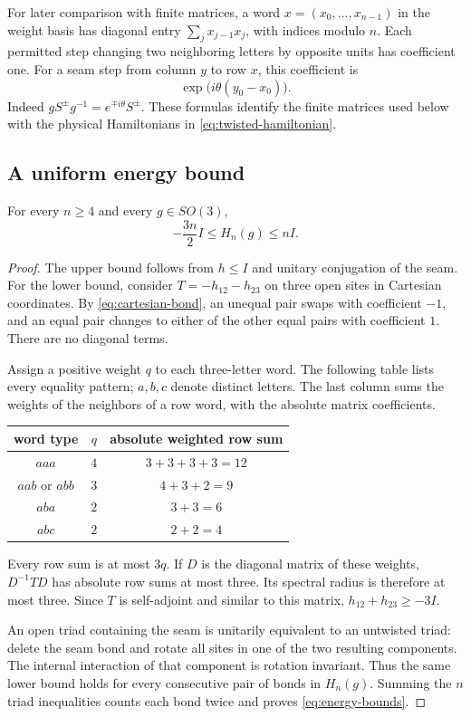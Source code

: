 For later comparison with finite matrices, a word $x=(x_0,\ldots,x_{n-1})$
in the weight basis has diagonal entry $\sum_j x_{j-1}x_j$, with indices
modulo $n$. Each permitted step changing two neighboring letters by
opposite units has coefficient one. For a seam step from column $y$ to
row $x$, this coefficient is
\begin{equation}\label{eq:seam-phase}
 \exp\bigl(i\theta(y_0-x_0)\bigr).
\end{equation}
Indeed $gS^\pm g^{-1}=e^{\mp i\theta}S^\pm$. These formulas identify the
finite matrices used below with the physical Hamiltonians in
\eqref{eq:twisted-hamiltonian}.

\subsection{A uniform energy bound}

\begin{lemma}\label{lem:energy}
For every $n\ge4$ and every $g\in SO(3)$,
\begin{equation}\label{eq:energy-bounds}
 -\frac{3n}{2}I\le H_n(g)\le nI.
\end{equation}
\end{lemma}

\begin{proof}
The upper bound follows from $h\le I$ and unitary conjugation of the
seam. For the lower bound, consider $T=-h_{12}-h_{23}$ on three open
sites in Cartesian coordinates. By \eqref{eq:cartesian-bond}, an unequal
pair swaps with coefficient $-1$, and an equal pair changes to either of
the other equal pairs with coefficient $1$. There are no diagonal terms.

Assign a positive weight $q$ to each three-letter word. The following
table lists every equality pattern; $a,b,c$ denote distinct letters.
The last column sums the weights of the neighbors of a row word, with
the absolute matrix coefficients.
\begin{center}
\begin{tabular}{c|c|c}
word type & $q$ & absolute weighted row sum\\ \hline
$aaa$ & $4$ & $3+3+3+3=12$\\
$aab$ or $abb$ & $3$ & $4+3+2=9$\\
$aba$ & $2$ & $3+3=6$\\
$abc$ & $2$ & $2+2=4$
\end{tabular}
\end{center}
Every row sum is at most $3q$. If $D$ is the diagonal matrix of these
weights, $D^{-1}TD$ has absolute row sums at most three. Its spectral
radius is therefore at most three. Since $T$ is self-adjoint and similar
to this matrix, $h_{12}+h_{23}\ge-3I$.

An open triad containing the seam is unitarily equivalent to an
untwisted triad: delete the seam bond and rotate all sites in one of
the two resulting components. The internal interaction of that component
is rotation invariant. Thus the same lower bound holds for every
consecutive pair of bonds in $H_n(g)$. Summing the $n$ triad inequalities
counts each bond twice and proves \eqref{eq:energy-bounds}.
\end{proof}
